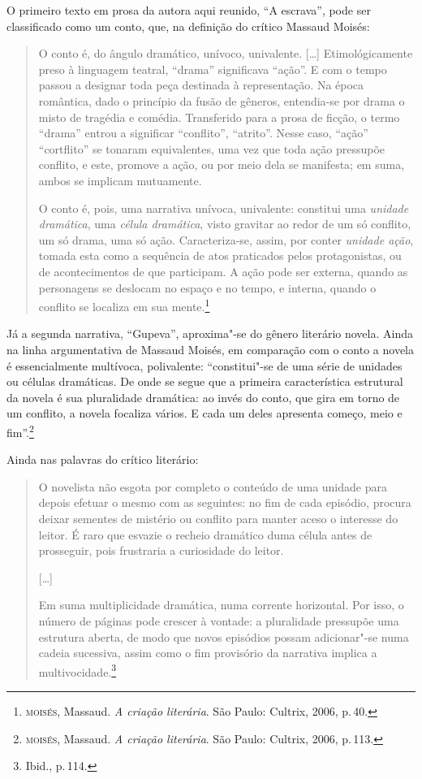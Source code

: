 O primeiro texto em prosa da autora aqui reunido, ``A escrava'', pode ser classificado como um conto, que, na definição do crítico Massaud Moisés:

\begin{quote}
O conto é, do ângulo dramático, unívoco, univalente. [\ldots]
Etimológicamente preso à linguagem teatral,
``drama'' significava ``ação''. E com o tempo passou a designar
toda peça destinada à representação. Na época romântica, dado o
princípio da fusão de gêneros, entendia-se por drama o misto de
tragédia e comédia. Transferido para a prosa de ficção, o termo
``drama'' entrou a significar ``conflito'', ``atrito''. Nesse caso,
``ação'' ``cortflito'' se tonaram equivalentes, uma vez que toda
ação pressupõe conflito, e este, promove a ação, ou por meio dela
se manifesta; em suma, ambos se implicam mutuamente.

O conto é, pois, uma narrativa unívoca, univalente: constitui
uma \textit{unidade dramática}, uma \textit{célula dramática}, visto gravitar ao
redor de um só conflito, um só drama, uma só ação. Caracteriza-se,
assim, por conter \textit{unidade ação}, tomada esta como a sequência de atos praticados pelos protagonistas, ou de acontecimentos de
que participam. A ação pode ser externa, quando as personagens se
deslocam no espaço e no tempo, e interna, quando o conflito se
localiza em sua mente.\footnote{\textsc{moisés}, Massaud. \textit{A criação literária}. São Paulo: Cultrix, 2006, p.\,40.}
\end{quote}

Já a segunda narrativa, ``Gupeva'', aproxima"-se do gênero literário novela.
Ainda na linha argumentativa de Massaud Moisés, em comparação com o conto a novela é
essencialmente multívoca, polivalente: ``constitui"-se de uma série de unidades ou células dramáticas. De onde se segue que a primeira característica estrutural da novela é sua pluralidade dramática: ao invés do conto, que gira em torno de um conflito, a novela focaliza vários. E cada um deles apresenta começo, meio e fim''.\footnote{\textsc{moisés}, Massaud. \textit{A criação literária}. São Paulo: Cultrix, 2006, p.\,113.}

Ainda nas palavras do crítico literário:

\begin{quote}
O novelista não esgota por completo o conteúdo de uma unidade para depois efetuar o mesmo com as seguintes: no fim de cada episódio, procura deixar sementes de mistério ou conflito para manter aceso o interesse do leitor. É raro que esvazie o recheio dramático duma célula antes de prosseguir, pois frustraria a curiosidade do leitor.

{[}\ldots{]}

Em suma multiplicidade dramática, numa corrente horizontal. Por isso, o número de páginas pode crescer à vontade: a pluralidade pressupõe uma estrutura aberta, de modo que novos episódios possam adicionar"-se numa cadeia sucessiva, assim como o fim provisório da narrativa implica a multivocidade.\footnote{Ibid., p.\,114.}
\end{quote}

